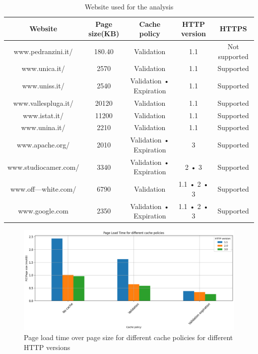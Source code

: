\documentclass[eng]{class}
\begin{document}
\begin{table}[H]
	\tiny
	\centering
	\begin{tabular}{|c|c|c|c|c|}
		\hline
		\linewidth=0cm
		Website              & Page size(KB) & Cache policy            & HTTP version & HTTPS         \\
		\hline
		www.pedranzini.it/   & 180.40        & Validation              & 1.1          & Not supported \\
		www.unica.it/        & 2570          & Validation              & 1.1          & Supported     \\
		www.uniss.it/        & 2540          & Validation • Expiration & 1.1          & Supported     \\
		www.vallespluga.it/  & 20120         & Validation              & 1.1          & Supported     \\
		www.istat.it/        & 11200         & Validation              & 1.1          & Supported     \\
		www.unina.it/        & 2210          & Validation              & 1.1          & Supported     \\
		www.apache.org/      & 2010          & Validation • Expiration & 3            & Supported     \\
		www.studiocamer.com/ & 3340          & Validation • Expiration & 2 • 3        & Supported     \\
		www.off---white.com/ & 6790          & Validation              & 1.1 • 2 • 3  & Supported     \\
		www.google.com       & 2350          & Validation • Expiration & 1.1 • 2 • 3  & Supported     \\
		\hline
	\end{tabular}
	\caption{Website used for the analysis}
	\label{tab-2}
\end{table}

\begin{figure}[H]
	\centering
	\includegraphics[width=\columnwidth]{images/plt_cache_policy.png}
	\caption{Page load time over page size for different cache policies for different HTTP versions}
	\label{fig-2}
\end{figure}
\end{document}
